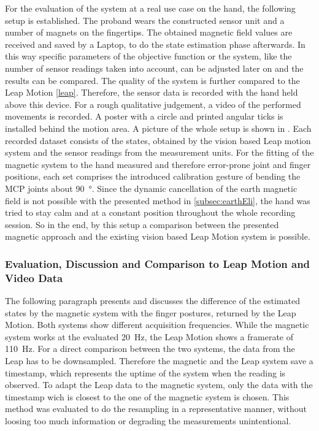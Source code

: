For the evaluation of the system at a real use case on the hand, the following setup is established. The proband wears the constructed sensor unit and a number of magnets on the fingertips. The obtained magnetic field values are received and saved by a Laptop, to do the state estimation phase afterwards. In this way specific parameters of the objective function or the system, like the number of sensor readings taken into account, can be adjusted later on and the results can be compared. The quality of the system is further compared to the Leap Motion \ref{leap}. Therefore, the sensor data is recorded with the hand held above this device. For a rough qualitative judgement, a video of the performed movements is recorded. A poster with a circle and printed angular ticks is installed behind the motion area. A picture of the whole setup is shown in . Each recorded dataset consists of the states, obtained by the vision based Leap motion system and the sensor readings from the measurement units. For the fitting of the magnetic system to the hand measured and therefore error-prone joint and finger positions, each set comprises the introduced calibration gesture of bending the \ac{MCP} joints about \SI{90}{\degree}. Since the dynamic cancellation of the earth magnetic field is not possible with the presented method in \ref{subsec:earthEli}, the hand was tried to stay calm and at a constant position throughout the whole recording session. So in the end, by this setup a comparison between the presented magnetic approach and the existing vision based Leap Motion system is possible.

\subsubsection{Evaluation, Discussion and Comparison to Leap Motion and Video Data}

The following paragraph presents and discusses the difference of the estimated states by the magnetic system with the finger postures, returned by the Leap Motion. Both systems show different acquisition frequencies. While the magnetic system works at the evaluated \SI{20}{\Hz}, the Leap Motion shows a framerate of \SI{110}{\Hz}. For a direct comparison between the two systems, the data from the Leap has to be downsampled. Therefore the magnetic and the Leap system save a timestamp, which represents the uptime of the system when the reading is observed. To adapt the Leap data to the magnetic system, only the data with the timestamp wich is closest to the one of the magnetic system is chosen. This method was evaluated to do the resampling in a representative manner, without loosing too much information or degrading the measurements unintentional. 

